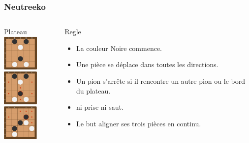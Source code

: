 \documentclass[11pt]{beamer}
\begin{document}
\begin{frame}

\frametitle{Neutreeko}
\subtitle{Neutreeko}
\begin{columns}[t]
\begin{column}{3cm}
	\begin{block}{Plateau}
	\centering \includegraphics[width=50pt]{images/neut.png}
	\\
	\centering \includegraphics[width=50pt]{images/neut2.png}
	\\
	\centering \includegraphics[width=50pt]{images/neut3.png}
	\end{block} 
\end{column}

\begin{column}{7cm}
	\begin{block}{Regle}
		\begin{itemize}
			\item La couleur Noire commence. 
			\item Une pièce se déplace dans toutes les directions.
			\item Un pion s'arrête si il rencontre un autre pion ou le bord du plateau.
			\item ni prise ni saut.
			\item Le but aligner ses trois pièces en continu.
		\end{itemize}
	\end{block}   
\end{column}
\end{columns}  
\end{frame}
\end{document}
